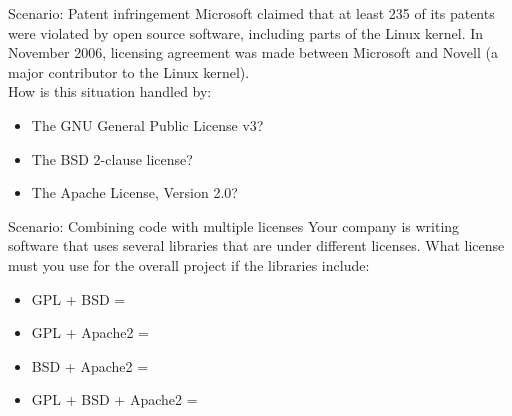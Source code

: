 \documentclass{beamer}
\begin{document}
\begin{frame}{Scenario: Patent infringement}
Microsoft claimed that at least 235 of its patents were violated by open source software, including parts of the Linux kernel.
In November 2006, licensing agreement was made between Microsoft and Novell (a major contributor to the Linux kernel).\\
\bigskip
How is this situation handled by:
\begin{itemize}
\item The GNU General Public License v3?
\item The BSD 2-clause license?
\item The Apache License, Version 2.0?
\end{itemize}
\end{frame}

\begin{frame}{Scenario: Combining code with multiple licenses}
Your company is writing software that uses several libraries that are under different licenses.
What license must you use for the overall project if the libraries include:
\begin{itemize}
\item GPL + BSD = \alt<2->{GPL}{?}
\item GPL + Apache2 = 
\item BSD + Apache2 = 
\item GPL + BSD + Apache2 = 
\end{itemize}
\bigskip
{}
\end{frame}
\end{document}
